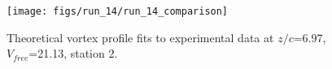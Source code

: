 \begin{figure}[H]
\centering
\texttt{[image: figs/run\_14/run\_14\_comparison]}
\caption{Theoretical vortex profile fits to experimental data at $z/c$=6.97, $V_{free}$=21.13, station 2.}
\label{fig:run_14_comparison}
\end{figure}


